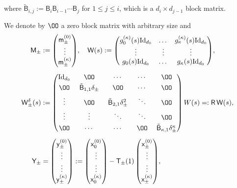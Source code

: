 \documentclass[JEP,XML,SOM,Unicode,NoFloatCountersInSection,published]{cedram}
\theoremstyle{definition}
\newcommand{\sB}{{\mathsf B}}
\newcommand{\sW}{{\mathsf W}}
\newcommand{\I}{\textup{Id}}\let\Id\I
\begin{document}
where $\tilde \sB_{i,j} := \sB_i \sB_{i-1} \cdots \sB_j$ for
$1 \le j \le i$, which is a $d_i \times d_{j-1}$ block matrix.

We denote by $\OO$ a zero block matrix with arbitrary size and
\begin{align}\label{eq:matrices}
\mathsf M_\pm &:=
\begin{pmatrix}
\mathsf m^{(0)}_\pm \\
\vdots \\
\mathsf m^{(\kappa)} _\pm
\end{pmatrix}\!, \quad
\sW(s) :=
\begin{pmatrix}
g_0^{(\kappa)}(s) \I_{d_0} & \dots & g_\kappa ^{(\kappa)} (s)
\I_{d_0} \\
\vdots & \vdots & \vdots \\
g_0(s) \I_{d_0} & \dots & g_\kappa(s) \I_{d_0}
\end{pmatrix}\!, \\[5pt]
\sW_\pm ^\delta(s) &:=\arraycolsep6.5pt
\begin{pmatrix}
\I_{d_0} & \OO & \cdots & \cdots & \OO \\[3pt]
\OO & \tilde \sB_{1,1} \delta_{\pm} & \OO & \cdots & \OO \\[3pt]
\vdots & \OO & \tilde\sB_{2,1} \delta_\pm ^2 & \ddots & \OO \\[3pt]
\vdots & \vdots & \ddots & \ddots & \OO \\[3pt]
\OO & \cdots & \cdots & \OO & \tilde \sB_{\kappa,1} \delta_\pm ^\kappa
\end{pmatrix}
W(s) =: \mathsf R \, \mathsf W(s),\\[5pt]
\mathsf Y_\pm &=
\begin{pmatrix}
\mathsf y^{(0)} _\pm \\
\vdots \\
\vdots \\
\mathsf y^{(\kappa)} _\pm
\end{pmatrix}
:= \begin{pmatrix}
\mathsf x_0 ^{(0)} \\
\vdots \\
\vdots \\
\mathsf x_0 ^{(\kappa)}
\end{pmatrix} - \mathsf T_\pm(1) \begin{pmatrix}
\mathsf x^{(0)} _\pm \\
\vdots \\
\vdots \\
\mathsf x^{(\kappa)} _\pm
\end{pmatrix}\!,
\end{align}\vspace*{-10pt}
\end{document}
